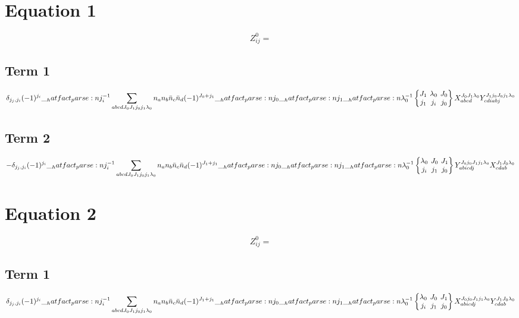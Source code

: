 \documentclass{scrartcl}
\newcommand{\sixj}[6]{\begingroup\setlength{\arraycolsep}{0.2em}\begin{Bmatrix} #1 & #2 & #3 \\ #4 & #5 & #6 \end{Bmatrix}\endgroup}
\begin{document}
\section{Equation 1}
\begin{dmath*}
Z_{i j}^{0} = 
\end{dmath*}
\subsection{Term 1}
\begin{dmath*}
\delta_{{j}_{j},{j}_{i}} \* (-1)^{{j}_{i}} \* \hatfact{{j}_{i}^{-1}} \* \sum_{a b c d {J}_{0} {J}_{1} {j}_{0} {j}_{1} {{\lambda}}_{0}} \* n_{a} \* n_{b} \* \bar{n}_{c} \* \bar{n}_{d} \* (-1)^{{J}_{0}+{j}_{1}} \* \hatfact{{j}_{0}} \* \hatfact{{j}_{1}} \* \hatfact{{{\lambda}}_{0}^{-1}} \* \sixj{{J}_{1}}{{{\lambda}}_{0}}{{J}_{0}}{{j}_{1}}{{j}_{i}}{{j}_{0}} \* X_{a b c d}^{{J}_{0} {J}_{1} {{\lambda}}_{0}} \* Y_{c d i a b j}^{{J}_{1} {j}_{0} {J}_{0} {j}_{1} {{\lambda}}_{0}}
\end{dmath*}
\subsection{Term 2}
\begin{dmath*}
-\delta_{{j}_{j},{j}_{i}} \* (-1)^{{j}_{i}} \* \hatfact{{j}_{i}^{-1}} \* \sum_{a b c d {J}_{0} {J}_{1} {j}_{0} {j}_{1} {{\lambda}}_{0}} \* n_{a} \* n_{b} \* \bar{n}_{c} \* \bar{n}_{d} \* (-1)^{{J}_{1}+{j}_{1}} \* \hatfact{{j}_{0}} \* \hatfact{{j}_{1}} \* \hatfact{{{\lambda}}_{0}^{-1}} \* \sixj{{{\lambda}}_{0}}{{J}_{0}}{{J}_{1}}{{j}_{i}}{{j}_{1}}{{j}_{0}} \* Y_{a b i c d j}^{{J}_{0} {j}_{0} {J}_{1} {j}_{1} {{\lambda}}_{0}} \* X_{c d a b}^{{J}_{1} {J}_{0} {{\lambda}}_{0}}
\end{dmath*}

\section{Equation 2}
\begin{dmath*}
Z_{i j}^{0} = 
\end{dmath*}
\subsection{Term 1}
\begin{dmath*}
\delta_{{j}_{j},{j}_{i}} \* (-1)^{{j}_{i}} \* \hatfact{{j}_{i}^{-1}} \* \sum_{a b c d {J}_{0} {J}_{1} {j}_{0} {j}_{1} {{\lambda}}_{0}} \* n_{a} \* n_{b} \* \bar{n}_{c} \* \bar{n}_{d} \* (-1)^{{J}_{1}+{j}_{1}} \* \hatfact{{j}_{0}} \* \hatfact{{j}_{1}} \* \hatfact{{{\lambda}}_{0}^{-1}} \* \sixj{{{\lambda}}_{0}}{{J}_{0}}{{J}_{1}}{{j}_{i}}{{j}_{1}}{{j}_{0}} \* X_{a b i c d j}^{{J}_{0} {j}_{0} {J}_{1} {j}_{1} {{\lambda}}_{0}} \* Y_{c d a b}^{{J}_{1} {J}_{0} {{\lambda}}_{0}}
\end{dmath*}
\end{document}
